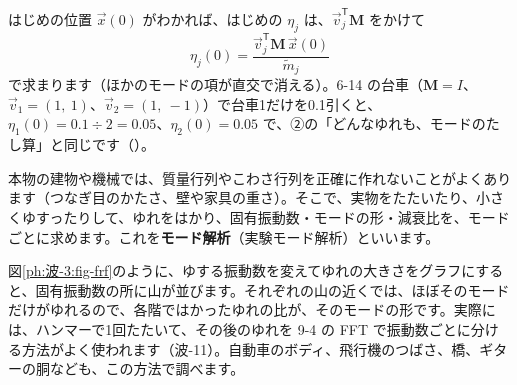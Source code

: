 \begin{phflow}[モードに分ける]
\end{phflow}

はじめの位置 $\vec x(0)$ がわかれば、はじめの $\eta_j$ は、$\vec v_j^{\mathsf T}\mathbf M$ をかけて
\[\eta_j(0)=\frac{\vec v_j^{\mathsf T}\mathbf M\,\vec x(0)}{\tilde m_j}\]
で求まります（ほかのモードの項が直交で消える）。6-14 の台車（$\mathbf M=I$、$\vec v_1=(1,\ 1)$、$\vec v_2=(1,\ -1)$）で台車1だけを0.1引くと、$\eta_1(0)=0.1\div2=0.05$、$\eta_2(0)=0.05$ で、②の「どんなゆれも、モードのたし算」と同じです（）。

本物の建物や機械では、質量行列やこわさ行列を正確に作れないことがよくあります（つなぎ目のかたさ、壁や家具の重さ）。そこで、実物をたたいたり、小さくゆすったりして、ゆれをはかり、固有振動数・モードの形・減衰比を、モードごとに求めます。これを\textbf{モード解析}（実験モード解析）といいます。

図\ref{ph:波-3:fig-frf}のように、ゆする振動数を変えてゆれの大きさをグラフにすると、固有振動数の所に山が並びます。それぞれの山の近くでは、ほぼそのモードだけがゆれるので、各階ではかったゆれの比が、そのモードの形です。実際には、ハンマーで1回たたいて、その後のゆれを 9-4 の FFT で振動数ごとに分ける方法がよく使われます（波-11）。自動車のボディ、飛行機のつばさ、橋、ギターの胴なども、この方法で調べます。

